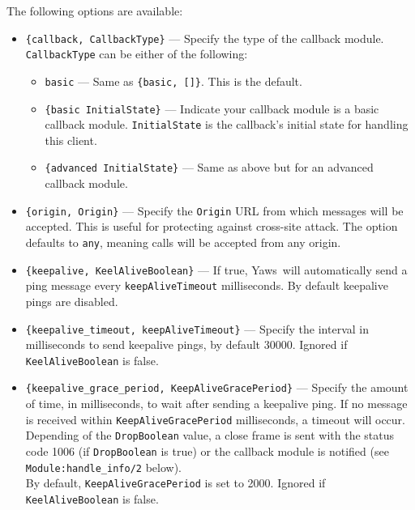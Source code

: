 \documentclass[11pt,oneside,english]{book}
\newcommand{\Yaws}            %
        {{\sc Yaws}}
\begin{document}
The following options are available:

\begin{itemize}
  \item \verb+{callback, CallbackType}+ ---
    Specify the type of the callback module. \verb+CallbackType+ can be either
    of the following:
    \begin{itemize}
      \item \verb+basic+ --- Same as \verb+{basic, []}+. This is the default.
      \item \verb+{basic InitialState}+ --- Indicate your callback module is a
        basic callback module. \verb+InitialState+ is the callback's initial
        state for handling this client.
      \item \verb+{advanced InitialState}+ --- Same as above but for an advanced
        callback module.
    \end{itemize}

  \item \verb+{origin, Origin}+ ---
    Specify the \verb+Origin+ URL from which messages will be accepted. This is
    useful for protecting against cross-site attack. The option defaults to
    \verb+any+, meaning calls will be accepted from any origin.

    \item \verb+{keepalive, KeelAliveBoolean}+ ---
      If true, \Yaws\ will automatically send a ping message every
      \verb+keepAliveTimeout+ milliseconds. By default keepalive pings are
      disabled.

    \item \verb+{keepalive_timeout, keepAliveTimeout}+ ---
      Specify the interval in milliseconds to send keepalive pings, by default
      30000. Ignored if \verb+KeelAliveBoolean+ is false.

    \item \verb+{keepalive_grace_period, KeepAliveGracePeriod}+ ---
      Specify the amount of time, in milliseconds, to wait after sending a
      keepalive ping. If no message is received within
      \verb+KeepAliveGracePeriod+ milliseconds, a timeout will occur. Depending
      of the \verb+DropBoolean+ value, a close frame is sent with the status
      code 1006 (if \verb+DropBoolean+ is true) or the callback module is
      notified (see \verb+Module:handle_info/2+ below).\\ By default,
      \verb+KeepAliveGracePeriod+ is set to 2000. Ignored if
      \verb+KeelAliveBoolean+ is false.


\end{itemize}
\end{document}
